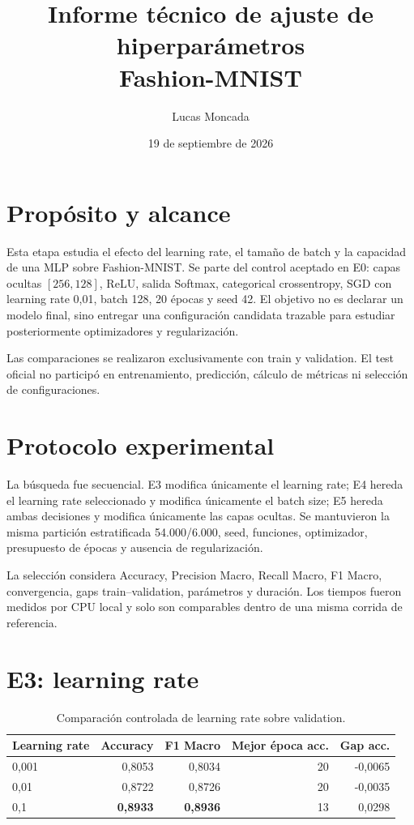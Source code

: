 \documentclass[10pt,a4paper]{article}
\title{Informe técnico de ajuste de hiperparámetros\\Fashion-MNIST}
\author{Lucas Moncada}
\date{19 de septiembre de 2026}
\begin{document}
\maketitle

\section{Propósito y alcance}

Esta etapa estudia el efecto del learning rate, el tamaño de batch y la capacidad de una MLP sobre Fashion-MNIST. Se parte del control aceptado en E0: capas ocultas $[256,128]$, ReLU, salida Softmax, categorical crossentropy, SGD con learning rate 0,01, batch 128, 20 épocas y seed 42. El objetivo no es declarar un modelo final, sino entregar una configuración candidata trazable para estudiar posteriormente optimizadores y regularización.

Las comparaciones se realizaron exclusivamente con train y validation. El test oficial no participó en entrenamiento, predicción, cálculo de métricas ni selección de configuraciones.

\section{Protocolo experimental}

La búsqueda fue secuencial. E3 modifica únicamente el learning rate; E4 hereda el learning rate seleccionado y modifica únicamente el batch size; E5 hereda ambas decisiones y modifica únicamente las capas ocultas. Se mantuvieron la misma partición estratificada 54.000/6.000, seed, funciones, optimizador, presupuesto de épocas y ausencia de regularización.

La selección considera Accuracy, Precision Macro, Recall Macro, F1 Macro, convergencia, gaps train--validation, parámetros y duración. Los tiempos fueron medidos por CPU local y solo son comparables dentro de una misma corrida de referencia.

\section{E3: learning rate}

\begin{table}[H]
\centering
\begin{tabular}{lrrrr}
\toprule
Learning rate & Accuracy & F1 Macro & Mejor época acc. & Gap acc. \\
\midrule
0,001 & 0,8053 & 0,8034 & 20 & -0,0065 \\
0,01  & 0,8722 & 0,8726 & 20 & -0,0035 \\
0,1   & \textbf{0,8933} & \textbf{0,8936} & 13 & 0,0298 \\
\bottomrule
\end{tabular}
\caption{Comparación controlada de learning rate sobre validation.}
\end{table}
\end{document}
